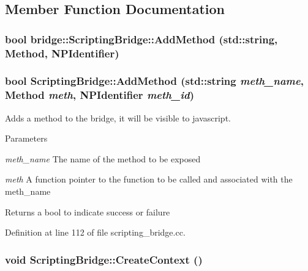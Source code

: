 \subsection{Member Function Documentation}
\hypertarget{classbridge_1_1_scripting_bridge_a24f9e87d1beed97f7231010636d5af55}{
\subsubsection[{AddMethod}]{\setlength{\rightskip}{0pt plus 5cm}bool bridge::ScriptingBridge::AddMethod (std::string, \/  {\bf Method}, \/  NPIdentifier)}}
\label{classbridge_1_1_scripting_bridge_a24f9e87d1beed97f7231010636d5af55}
\hypertarget{classbridge_1_1_scripting_bridge_aa5f733424325e07c884397e3f301f01c}{
\subsubsection[{AddMethod}]{\setlength{\rightskip}{0pt plus 5cm}bool ScriptingBridge::AddMethod (std::string {\em meth\_\-name}, \/  {\bf Method} {\em meth}, \/  NPIdentifier {\em meth\_\-id})}}
\label{classbridge_1_1_scripting_bridge_aa5f733424325e07c884397e3f301f01c}
Adds a method to the bridge, it will be visible to javascript. 
\begin{DoxyParams}{Parameters}
\item[{\em meth\_\-name}]The name of the method to be exposed \item[{\em meth}]A function pointer to the function to be called and associated with the meth\_\-name \end{DoxyParams}
\begin{DoxyReturn}{Returns}
a bool to indicate success or failure 
\end{DoxyReturn}


Definition at line 112 of file scripting\_\-bridge.cc.

\hypertarget{classbridge_1_1_scripting_bridge_a1ebec17acf6dfcd03462eee8fec9406e}{
\subsubsection[{CreateContext}]{\setlength{\rightskip}{0pt plus 5cm}void ScriptingBridge::CreateContext ()}}
\label{classbridge_1_1_scripting_bridge_a1ebec17acf6dfcd03462eee8fec9406e}


